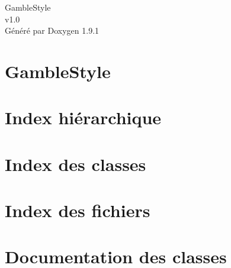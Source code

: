 \let\mypdfximage\pdfximage\def\pdfximage{\immediate\mypdfximage}\documentclass[twoside]{book}
\newcommand{\+}{\discretionary{\mbox{\scriptsize$\hookleftarrow$}}{}{}}
\newcommand{\clearemptydoublepage}{%
  \newpage{\pagestyle{empty}\cleardoublepage}%
}
\begin{document}
\raggedbottom

\hypersetup{pageanchor=false,
             bookmarksnumbered=true,
             pdfencoding=unicode
            }
\begin{titlepage}
\vspace*{7cm}
\begin{center}%
{\Large Gamble\+Style \\[1ex]\large v1.\+0 }\\
\vspace*{1cm}
{\large Généré par Doxygen 1.9.1}\\
\end{center}
\end{titlepage}
\clearemptydoublepage
{}
\tableofcontents
\clearemptydoublepage
{}
\hypersetup{pageanchor=true}

\chapter{Gamble\+Style}
\label{index}\hypertarget{index}{}
\chapter{Index hiérarchique}

\chapter{Index des classes}

\chapter{Index des fichiers}

\chapter{Documentation des classes}


















\end{document}
